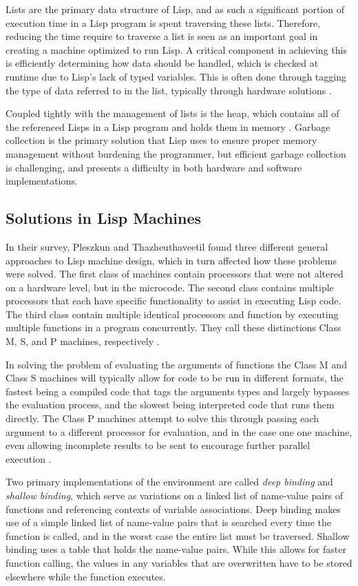 \documentclass[journal]{IEEEtran}
\begin{document}
Lists are the primary data structure of Lisp, and as such a significant portion of execution time in a Lisp program is spent traversing these lists. Therefore, reducing the time require to traverse a list is seen as an important goal in creating a machine optimized to run Lisp. A critical component in achieving this is efficiently determining how data should be handled, which is checked at runtime due to Lisp's lack of typed variables. This is often done through tagging the type of data referred to in the list, typically through hardware solutions \cite{pt}.

Coupled tightly with the management of lists is the heap, which contains all of the referenced Lisps in a Lisp program and holds them in memory \cite{pt}. Garbage collection is the primary solution that Lisp uses to ensure proper memory management without burdening the programmer, but efficient garbage collection is challenging, and presents a difficulty in both hardware and software implementations.

\subsection{Solutions in Lisp Machines}
In their survey, Pleszkun and Thazheuthaveetil found three different general approaches to Lisp machine design, which in turn affected how these problems were solved. The first class of machines contain processors that were not altered on a hardware level, but in the microcode. The second class contains multiple processors that each have specific functionality to assist in executing Lisp code. The third class contain multiple identical processors and function by executing multiple functions in a program concurrently. They call these distinctions Class M, S, and P machines, respectively \cite{pt}.

In solving the problem of evaluating the arguments of functions the Class M and Class S machines will typically allow for code to be run in different formats, the fastest being a compiled code that tags the arguments types and largely bypasses the evaluation process, and the slowest being interpreted code that runs them directly. The Class P machines attempt to solve this through passing each argument to a different processor for evaluation, and in the case one one machine, even allowing incomplete results to be sent to encourage further parallel execution \cite{pt}.

Two primary implementations of the environment are called \textit{deep binding} and \textit{shallow binding}, which serve as variations on a linked list of name-value pairs of functions and referencing contexts of variable associations. Deep binding makes use of a simple linked list of name-value pairs that is searched every time the function is called, and in the worst case the entire list must be traversed. Shallow binding uses a table that holds the name-value pairs. While this allows for faster function calling, the values in any variables that are overwritten have to be stored elsewhere while the function executes.
\end{document}
